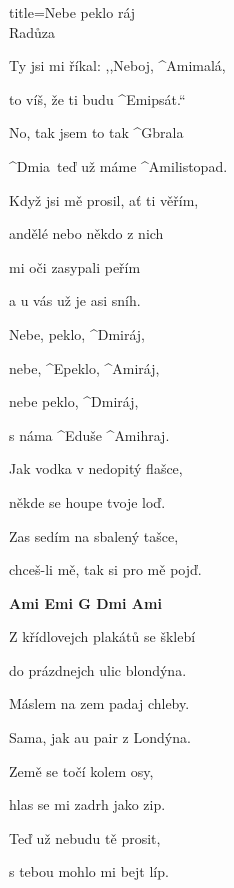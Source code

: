 \begin{song}{title=\predtitle\centering Nebe peklo ráj \\\large Radůza \vspace*{-0.3cm}}  %
\begin{centerjustified}
\nejnejvetsi

\begin{varwidth}[t]{0.48\textwidth}\setlength{\parindent}{\pindent}  %
\sloka 
	Ty jsi mi říkal: ,,Neboj, ^{Ami\z }malá,

	to víš, že ti budu ^{Emi\z}psát.``

	No, tak jsem to tak ^{G\z}brala

	^{Dmi\z}a~teď už máme ^{Ami\z}listopad.

\sloka
	Když jsi mě prosil, ať ti věřím,

	andělé nebo někdo z nich

	mi oči zasypali peřím

	a u vás už je asi sníh.

	Nebe, peklo, ^{Dmi\z}ráj,~~~

	nebe, ^{E\z}peklo, ^{Ami\z}ráj,~~~

	nebe peklo, ^{Dmi\z}ráj,~~~~

	s náma ^{E\z}duše ^{Ami}hraj.


\sloka
	Jak vodka v nedopitý flašce,

	někde se houpe tvoje loď.

	Zas sedím na sbalený tašce,

	chceš-li mě, tak si pro mě pojď.

    

\end{varwidth}\begin{varwidth}[t]{0.5\textwidth}\setlength{\parindent}{\pindent}
\vspace*{0.465cm}

\phantom{.}

\textbf{Ami  Emi  G  Dmi  Ami}


\sloka
	Z křídlovejch plakátů se šklebí
	
	do prázdnejch ulic blondýna.
	
	Máslem na zem padaj chleby.
	
	Sama, jak au pair z Londýna.

\sloka
	Země se točí kolem osy,
	
	hlas se mi zadrh jako zip.
	
	Teď už nebudu tě prosit,
	
	s tebou mohlo mi bejt líp.


\end{varwidth}

\end{centerjustified}
\setcounter{Slokočet}{0}
\end{song}
